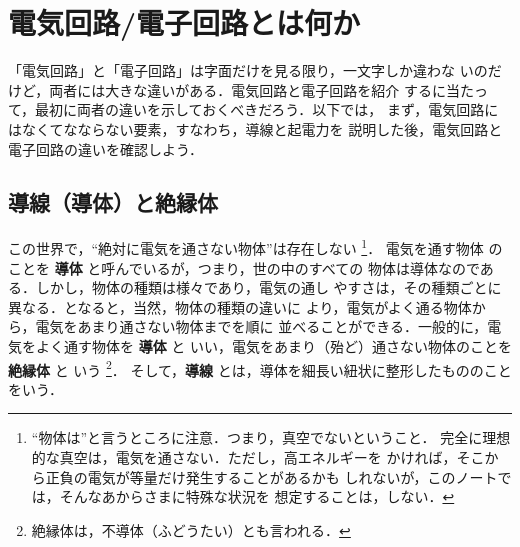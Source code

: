 ﻿%

    \section{電気回路/電子回路とは何か}
    \begin{mycomment}
        「電気回路」と「電子回路」は字面だけを見る限り，一文字しか違わな
        いのだけど，両者には大きな違いがある．電気回路と電子回路を紹介
        するに当たって，最初に両者の違いを示しておくべきだろう．以下では，
        まず，電気回路にはなくてなならない要素，すなわち，導線と起電力を
        説明した後，電気回路と電子回路の違いを確認しよう．
    \end{mycomment}

    \subsection{導線（導体）と絶縁体}
        この世界で，“絶対に電気を通さない物体”は存在しない
            \footnote{
                “物体は”と言うところに注意．つまり，真空でないということ．
                完全に理想的な真空は，電気を通さない．ただし，高エネルギーを
                かければ，そこから正負の電気が等量だけ発生することがあるかも
                しれないが，このノートでは，そんなあからさまに特殊な状況を
                想定することは，しない．
            }．
        電気を通す物体
        のことを \textbf{導体} と呼んでいるが，つまり，世の中のすべての
        物体は導体なのである．しかし，物体の種類は様々であり，電気の通し
        やすさは，その種類ごとに異なる．となると，当然，物体の種類の違いに
        より，電気がよく通る物体から，電気をあまり通さない物体までを順に
        並べることができる．一般的に，電気をよく通す物体を \textbf{導体} と
        いい，電気をあまり（殆ど）通さない物体のことを \textbf{絶縁体} と
        いう
            \footnote{
                絶縁体は，不導体（ふどうたい）とも言われる．
            }．
        そして，\textbf{導線} とは，導体を細長い紐状に整形したもののこと
        をいう．

